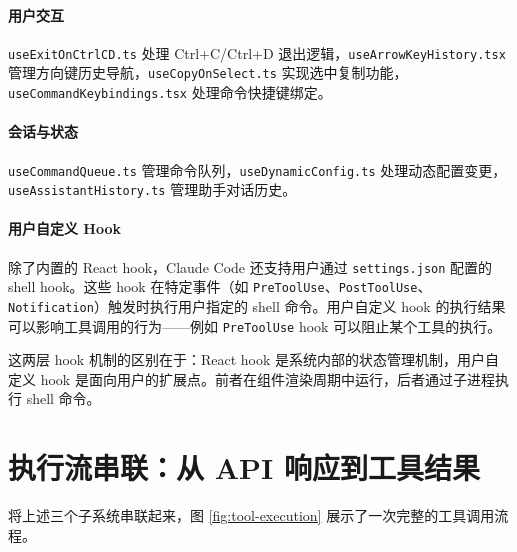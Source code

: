 \paragraph{用户交互}

\texttt{useExitOnCtrlCD.ts} 处理 Ctrl+C/Ctrl+D 退出逻辑，\texttt{useArrowKeyHistory.tsx} 管理方向键历史导航，\texttt{useCopyOnSelect.ts} 实现选中复制功能，\texttt{useCommandKeybindings.tsx} 处理命令快捷键绑定。

\paragraph{会话与状态}

\texttt{useCommandQueue.ts} 管理命令队列，\texttt{useDynamicConfig.ts} 处理动态配置变更，\texttt{useAssistantHistory.ts} 管理助手对话历史。

\paragraph{用户自定义 Hook}

除了内置的 React hook，Claude Code 还支持用户通过 \texttt{settings.json} 配置的 shell hook。这些 hook 在特定事件（如 \texttt{PreToolUse}、\texttt{PostToolUse}、\texttt{Notification}）触发时执行用户指定的 shell 命令。用户自定义 hook 的执行结果可以影响工具调用的行为——例如 \texttt{PreToolUse} hook 可以阻止某个工具的执行。

这两层 hook 机制的区别在于：React hook 是系统内部的状态管理机制，用户自定义 hook 是面向用户的扩展点。前者在组件渲染周期中运行，后者通过子进程执行 shell 命令。

\section{执行流串联：从 API 响应到工具结果}

将上述三个子系统串联起来，图 \ref{fig:tool-execution} 展示了一次完整的工具调用流程。

